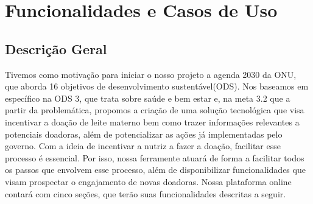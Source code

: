\chapter{Funcionalidades e Casos de Uso}
\section{Descrição Geral}
\label{sec:descricao}
Tivemos como motivação para iniciar o nosso projeto a agenda 2030 da ONU, que aborda 16 objetivos de desenvolvimento sustentável(ODS). Nos baseamos em específico na ODS 3, que trata sobre saúde e bem estar e, na meta 3.2 que
a partir da problemática, propomos a criação de uma solução tecnológica que visa incentivar a doação de leite materno bem como trazer informações relevantes a potenciais doadoras, além de potencializar as ações já implementadas pelo governo.
Com a ideia de incentivar a nutriz a fazer a doação, facilitar esse processo é essencial. Por isso, nossa ferramente atuará de forma a facilitar todos os passos que envolvem esse processo, além de disponibilizar funcionalidades que visam prospectar o engajamento de novas doadoras. 
Nossa plataforma online contará com cinco seções, que terão suas funcionalidades descritas a seguir. 

